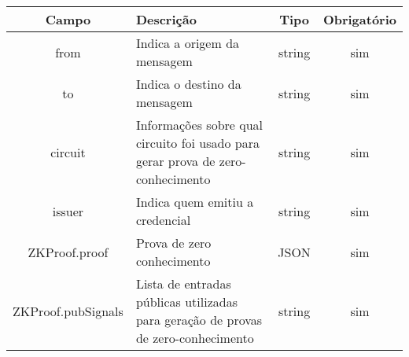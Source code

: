 \begin{table}[h]
    \centering
    \begin{tabular}{|c|p{8cm}|c|c|}
    \hline
    \rowcolor{lightgray} \textbf{Campo} & \textbf{Descrição} & \textbf{Tipo} & \textbf{Obrigatório} \\
    \hline
    from & Indica a origem da mensagem & string & sim \\
    \hline
    to & Indica o destino da mensagem & string & sim \\
    \hline
    circuit & Informações sobre qual circuito foi usado para gerar prova de zero-conhecimento  & string & sim \\
     \hline
    issuer & Indica quem emitiu a credencial & string & sim \\
    \hline
    ZKProof.proof & Prova de zero conhecimento & JSON & sim \\
    \hline
    ZKProof.pubSignals & Lista de entradas públicas utilizadas para geração de provas de zero-conhecimento & string & sim \\
    \hline
    \end{tabular}
\end{table}
